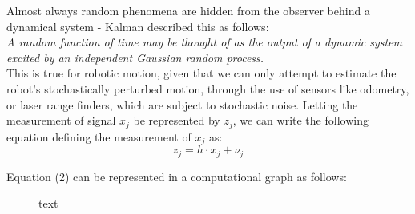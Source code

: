 \documentclass[a4paper]{article}
\begin{document}
Almost always random phenomena are hidden from the observer behind a dynamical system - Kalman described this as follows:\\

\textit{A random function of time may be thought of as the output of a dynamic system excited by an independent Gaussian random process.} \cite{Kalman:1960}\\

This is true for robotic motion, given that we can only attempt to estimate the robot's stochastically perturbed motion, through the use of sensors like odometry, or laser range finders, which are subject to stochastic noise. Letting the measurement of signal $x_j$ be represented by $z_j$, we can write the following equation defining the measurement of $x_j$ as:
\begin{equation}
z_j = h \cdot x_j + \nu_j
\end{equation} 

Equation (2) can be represented in a computational graph as follows:
\begin{figure}[h]
\centering
{}
\caption{text}
\end{figure}
\end{document}

